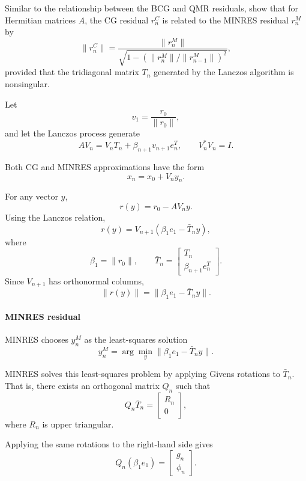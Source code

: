 \documentclass{ctexart}
\begin{document}
\begin{problem}\label{pro:2}
  Similar to the relationship between the BCG and QMR residuals, show that for Hermitian matrices $A$, the CG residual $r_n^C$ is related to the MINRES residual $r_n^M$ by
  \[
    \|r_n^C\|
    =
    \frac{\|r_n^M\|}
    {\sqrt{1-(\|r_n^M\|/\|r_{n-1}^M\|)^2}},
  \]
  provided that the tridiagonal matrix $T_n$ generated by the Lanczos algorithm is nonsingular.
\end{problem}
\begin{solution}

  Let
  \[
    v_1=\frac{r_0}{\|r_0\|},
  \]
  and let the Lanczos process generate
  \[
    AV_n
    =
    V_nT_n+\beta_{n+1}v_{n+1}e_n^T,
    \qquad
    V_n^*V_n=I.
  \]

  Both CG and MINRES approximations have the form
  \[
    x_n=x_0+V_n y_n.
  \]

  For any vector \(y\),
  \[
    r(y)
    =
    r_0-AV_n y.
  \]
  Using the Lanczos relation,
  \[
    r(y)
    =
    V_{n+1}
    \left(
      \beta_1 e_1-\bar T_n y
    \right),
  \]
  where
  \[
    \beta_1=\|r_0\|,
    \qquad
    \bar T_n=
    \begin{bmatrix}
      T_n\\
      \beta_{n+1}e_n^T
    \end{bmatrix}.
  \]
  Since \(V_{n+1}\) has orthonormal columns,
  \[
    \|r(y)\|
    =
    \|
    \beta_1 e_1-\bar T_n y
    \|.
  \]

  \paragraph{MINRES residual}

  MINRES chooses \(y_n^M\) as the least-squares solution
  \[
    y_n^M
    =
    \arg\min_y
    \|
    \beta_1 e_1-\bar T_n y
    \|.
  \]

  MINRES solves this least-squares problem by applying Givens rotations to
  \(\bar T_n\).
  That is, there exists an orthogonal matrix \(Q_n\) such that
  \[
    Q_n \bar T_n
    =
    \begin{bmatrix}
      R_n\\
      0
    \end{bmatrix},
  \]
  where \(R_n\) is upper triangular.

  Applying the same rotations to the right-hand side gives
  \[
    Q_n(\beta_1 e_1)
    =
    \begin{bmatrix}
      g_n\\
      \phi_n
    \end{bmatrix}.
  \]


\end{solution}
\end{document}
